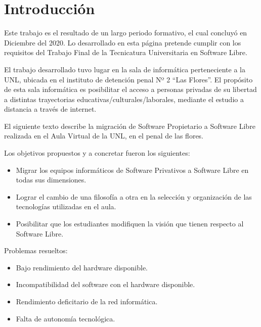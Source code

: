
\chapter{Introducción}\label{ch:ntroducción}


	Este trabajo es el resultado de un largo periodo formativo, el cual 
	concluyó en Diciembre del 2020. Lo desarrollado en esta página pretende 
	cumplir con los requisitos del Trabajo Final de la Tecnicatura Universitaria 
	en Software Libre.\par
	
	El trabajo desarrollado tuvo lugar en la sala de informática perteneciente 
	a la UNL, ubicada en el instituto de detención penal Nº 2 “Las Flores”. 
	El propósito de esta sala informática es posibilitar el acceso a personas 
	privadas de su libertad a distintas trayectorias educativas/culturales/laborales, 
	mediante el estudio a distancia a través de internet.\par
	
	El siguiente texto describe la migración de Software Propietario a Software Libre 
	realizada en el Aula Virtual de la UNL, en el penal de las flores.\par
	
	Los objetivos propuestos y a concretar fueron los siguientes:\par
	
	\begin{itemize}
	
	    \item Migrar los equipos informáticos de Software Privativos 
	    a Software Libre en todas sus dimensiones.
	      
	    \item Lograr el cambio de una filosofía a otra en la selección y organización 
	    de las tecnologías utilizadas en el aula.
	      
	    \item Posibilitar que los estudiantes modifiquen la visión que tienen 
	    respecto al Software Libre.
	      
	\end{itemize}
	        
	     \vspace{0,5cm}
	
	     Problemas resueltos:
	
	\begin{itemize}
	            
	
	    \item Bajo rendimiento del hardware disponible.
	
	    
	    \item Incompatibilidad del software con el hardware disponible.
	
	    
	    \item Rendimiento deficitario de la red informática.
	
	    
	    \item Falta de autonomía tecnológica.
	
	    
	\end{itemize}
	        
